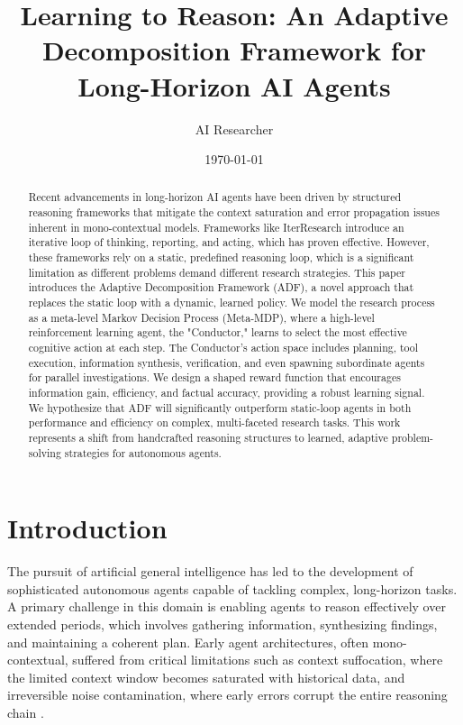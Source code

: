 \documentclass{article}
\title{Learning to Reason: An Adaptive Decomposition Framework for Long-Horizon AI Agents}
\author[1]{AI Researcher}
\affil[1]{Skunkworks Division, The AI Institute}
\date{\today}
\begin{document}
\maketitle

\begin{abstract}
Recent advancements in long-horizon AI agents have been driven by structured reasoning frameworks that mitigate the context saturation and error propagation issues inherent in mono-contextual models. Frameworks like IterResearch introduce an iterative loop of thinking, reporting, and acting, which has proven effective. However, these frameworks rely on a static, predefined reasoning loop, which is a significant limitation as different problems demand different research strategies. This paper introduces the Adaptive Decomposition Framework (ADF), a novel approach that replaces the static loop with a dynamic, learned policy. We model the research process as a meta-level Markov Decision Process (Meta-MDP), where a high-level reinforcement learning agent, the "Conductor," learns to select the most effective cognitive action at each step. The Conductor's action space includes planning, tool execution, information synthesis, verification, and even spawning subordinate agents for parallel investigations. We design a shaped reward function that encourages information gain, efficiency, and factual accuracy, providing a robust learning signal. We hypothesize that ADF will significantly outperform static-loop agents in both performance and efficiency on complex, multi-faceted research tasks. This work represents a shift from handcrafted reasoning structures to learned, adaptive problem-solving strategies for autonomous agents.
\end{abstract}

\section{Introduction}
The pursuit of artificial general intelligence has led to the development of sophisticated autonomous agents capable of tackling complex, long-horizon tasks. A primary challenge in this domain is enabling agents to reason effectively over extended periods, which involves gathering information, synthesizing findings, and maintaining a coherent plan. Early agent architectures, often mono-contextual, suffered from critical limitations such as context suffocation, where the limited context window becomes saturated with historical data, and irreversible noise contamination, where early errors corrupt the entire reasoning chain \cite{qiao2025webresearcher}.
\end{document}

